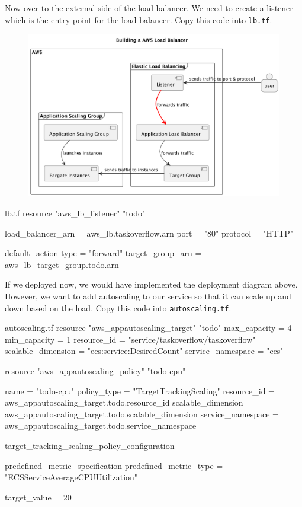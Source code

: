 \documentclass{csse4400}
\begin{document}
Now over to the external side of the load balancer.
We need to create a listener which is the entry point for the load balancer.
Copy this code into \texttt{lb.tf}.

\begin{figure}[H]
  \begin{center}
    \includegraphics[scale=0.2]{diagrams/lb4fargate}
  \end{center}
\end{figure}

\begin{code}[language=terraform,numbers=none,keepspaces=true]{lb.tf}
resource "aws_lb_listener" "todo" {
  load_balancer_arn   = aws_lb.taskoverflow.arn
  port                = "80"
  protocol            = "HTTP"

  default_action {
    type              = "forward"
    target_group_arn  = aws_lb_target_group.todo.arn
  }
}
\end{code}

If we deployed now, we would have implemented the deployment diagram above.
However, we want to add autoscaling to our service so that it can scale up and down based on the load.
Copy this code into \texttt{autoscaling.tf}.

\begin{code}[language=terraform,numbers=none,keepspaces=true]{autoscaling.tf}
resource "aws_appautoscaling_target" "todo" {
  max_capacity        = 4
  min_capacity        = 1
  resource_id         = "service/taskoverflow/taskoverflow"
  scalable_dimension  = "ecs:service:DesiredCount"
  service_namespace   = "ecs"
}


resource "aws_appautoscaling_policy" "todo-cpu" {
  name                = "todo-cpu"
  policy_type         = "TargetTrackingScaling"
  resource_id         = aws_appautoscaling_target.todo.resource_id
  scalable_dimension  = aws_appautoscaling_target.todo.scalable_dimension
  service_namespace   = aws_appautoscaling_target.todo.service_namespace

  target_tracking_scaling_policy_configuration {
    predefined_metric_specification {
      predefined_metric_type  = "ECSServiceAverageCPUUtilization"
    }

    target_value              = 20
  }
}
\end{code}
\end{document}
